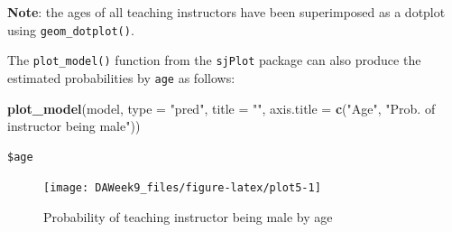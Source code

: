 \documentclass[]{article}
\newenvironment{Shaded}{\begin{snugshade}}{\end{snugshade}}
\newcommand{\KeywordTok}[1]{\textcolor[rgb]{0.13,0.29,0.53}{\textbf{#1}}}
\newcommand{\DataTypeTok}[1]{\textcolor[rgb]{0.13,0.29,0.53}{#1}}
\newcommand{\DecValTok}[1]{\textcolor[rgb]{0.00,0.00,0.81}{#1}}
\newcommand{\FloatTok}[1]{\textcolor[rgb]{0.00,0.00,0.81}{#1}}
\newcommand{\StringTok}[1]{\textcolor[rgb]{0.31,0.60,0.02}{#1}}
\newcommand{\OtherTok}[1]{\textcolor[rgb]{0.56,0.35,0.01}{#1}}
\newcommand{\OperatorTok}[1]{\textcolor[rgb]{0.81,0.36,0.00}{\textbf{#1}}}
\newcommand{\NormalTok}[1]{#1}
\begin{document}
\begin{Shaded}
\end{Shaded}

\textbf{Note}: the ages of all teaching instructors have been
superimposed as a dotplot using \texttt{geom\_dotplot()}.

The \texttt{plot\_model()} function from the \texttt{sjPlot} package can
also produce the estimated probabilities by \texttt{age} as follows:

\begin{Shaded}
\begin{Highlighting}[]
\KeywordTok{plot_model}\NormalTok{(model, }\DataTypeTok{type =} \StringTok{"pred"}\NormalTok{, }\DataTypeTok{title =} \StringTok{""}\NormalTok{, }
           \DataTypeTok{axis.title =} \KeywordTok{c}\NormalTok{(}\StringTok{"Age"}\NormalTok{, }\StringTok{"Prob. of instructor being male"}\NormalTok{))}
\end{Highlighting}
\end{Shaded}

\begin{verbatim}
$age
\end{verbatim}

\begin{figure}

{\centering \texttt{[image: DAWeek9\_files/figure-latex/plot5-1]} 

}

\caption{\label{fig.plot5}Probability of teaching instructor being male by age}\label{fig:plot5}
\end{figure}
\end{document}
